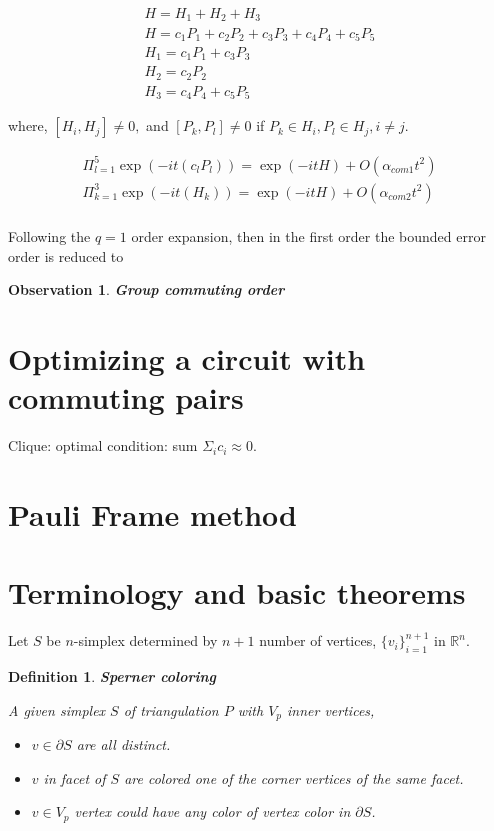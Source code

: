 \documentclass[a4paper,12pt]{article}
\newtheorem{definition}{Definition}
\newtheorem{observation}{Observation}
\begin{document}
\begin{align}
    H = H_1 + H_2 + H_3  \\
    H =  c_1 P_1 + c_2 P_2 + c_3 P_3 + c_4 P_4 + c_5 P_5\\
    H_1 = c_1 P_1 + c_3 P_3 \\
    H_2 = c_2 P_2\\
    H_3 = c_4 P_4 + c_5 P_5
\end{align}

where, $[H_i, H_j] \neq 0,$ and 
$[P_k, P_l] \neq 0$ if $P_k \in H_i, P_l \in H_j, i \neq j$.

\begin{align}
    \Pi_{l=1}^5 \exp(- i t (c_l P_l)) = \exp(-it H) + O(\alpha_{com 1} t^2)\\
    \Pi_{k=1}^3 \exp(- i t (H_k)) = \exp(-it H) + O(\alpha_{com 2} t^2)\\
\end{align}


Following the $q=1$ order expansion, then in the first order the bounded error 
order is reduced to 


\begin{observation} \textbf{Group commuting order}

\end{observation}


\section{Optimizing a circuit with commuting pairs}

Clique: optimal condition: sum $ \Sigma_{i} c_i \approx 0 $.

\section{Pauli Frame method}

\section{}

\section{Terminology and basic theorems}

Let $S$ be $n$-simplex determined by $n+1$ number of vertices, $\{v_i\}_{i=1}^{n+1}$ in $\mathbb{R}^n$.
\begin{definition}\textbf{Sperner coloring}

    A given simplex $S$ of triangulation $P$ with $V_p$ inner vertices,
    \begin{itemize}
        \item $v \in \partial S$ are all distinct.
        \item $v$ in facet of $S$ are colored one of the corner vertices of the same facet.
        \item $v \in V_p$ vertex could have any color of vertex color in $\partial S$.
    \end{itemize}
\end{definition}
\end{document}
